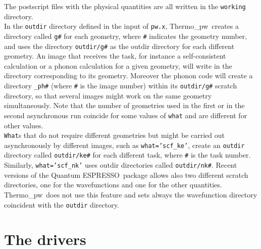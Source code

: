\documentclass[12pt,a4paper,twoside]{report}
\def\qe{{\sc Quantum ESPRESSO}}
\def\tpw{{\sc Thermo\_pw}}
\begin{document}
The postscript files with the physical quantities are all written in
the \texttt{working} directory. \\
In the \texttt{outdir} directory defined in the input of \texttt{pw.x},
\tpw\ creates a directory called \texttt{g\#} for each geometry, 
where \texttt{\#} indicates the geometry number, and uses the directory 
\texttt{outdir/g\#} as the outdir directory for each different geometry. 
An image that receives the task, for instance a self-consistent calculation 
or a phonon calculation for a given geometry, will write in the directory 
corresponding to its geometry.
Moreover the phonon code will create a directory \texttt{\_ph\#} 
(where \texttt{\#} is the image number) within its \texttt{outdir/g\#} scratch 
directory, so that several images might work on the same geometry 
simultaneously.
Note that the number of geometries used in the first or in the second
asynchronous run coincide for some values of \texttt{what} and are
different for other values. \\
\texttt{What}s that do not require different geometries but might be carried
out asynchronously by different images, such as \texttt{what='scf\_ke'}, 
create an \texttt{outdir} directory called
\texttt{outdir/ke\#} for each different task, where \texttt{\#} is the
task number. Similarly, \texttt{what='scf\_nk'} uses outdir directories
called \texttt{outdir/nk\#}.
Recent versions of the \qe\ package allows also two different scratch
directories, one for the wavefunctions and one for the other quantities.
\tpw\ does not use this feature and sets always the wavefunction
directory coincident with the \texttt{outdir} directory.

\newpage
{\color{dark-blue}\chapter{The drivers}}
\color{black}
\end{document}

